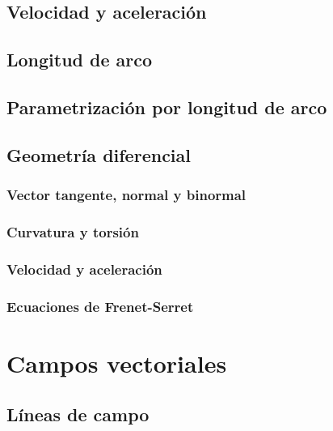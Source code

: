 \documentclass[12pt, fleqn]{report}                             %
\begin{document}
            \subsection{Velocidad y aceleración}
        
            \subsection{Longitud de arco}
            
            \subsection{Parametrización por longitud de arco}
            
            \subsection{Geometría diferencial}
                
                \subsubsection{Vector tangente, normal y binormal}
                
                \subsubsection{Curvatura y torsión}
                
                \subsubsection{Velocidad y aceleración}
                
                \subsubsection{Ecuaciones de Frenet-Serret}
            
        \section{Campos vectoriales}
        
            \subsection{Líneas de campo}
            
\end{document}
